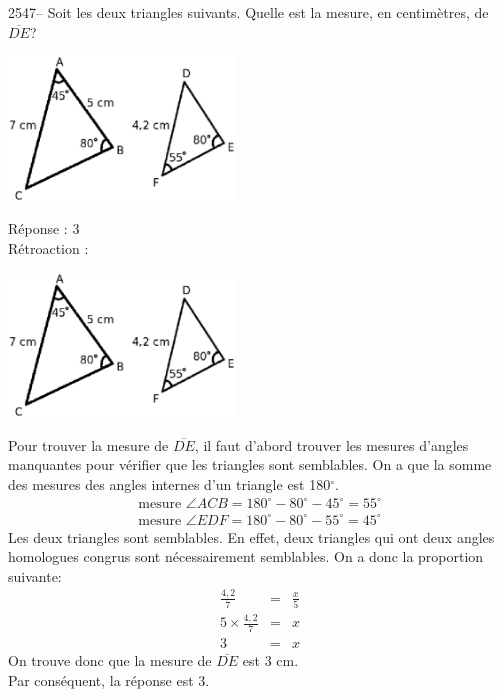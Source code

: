 \documentclass[letterpaper, 12pt]{article}
\begin{document}
2547-- Soit les deux triangles suivants. Quelle est la mesure, en centim\`etres, de $\overline{DE}$?\\
\begin{center}
 \includegraphics[width=6cm,bb=14 14 471 303]{Q2547.eps}
\end{center}

R\'eponse : 3\\

R\'etroaction :\\
\begin{center}
 \includegraphics[width=6cm,bb=14 14 471 303]{Q2547.eps}
\end{center}
Pour trouver la mesure de $\overline{DE}$, il faut d'abord trouver les mesures d'angles manquantes pour v\'erifier que les triangles sont semblables. On a que la somme des mesures des angles internes d'un triangle est 180$^{\circ}$.
\begin{eqnarray*}
 \textrm{mesure }\angle ACB = 180^{\circ}-80^{\circ}-45^{\circ}=55^{\circ}\\
 \textrm{mesure }\angle EDF = 180^{\circ}-80^{\circ}-55^{\circ}=45^{\circ}
\end{eqnarray*}
Les deux triangles sont semblables. En effet, deux triangles qui ont deux angles homologues congrus sont n\'ecessairement semblables. On a donc la proportion suivante:
\begin{eqnarray*}
 \frac{4,2}{7}&=&\frac{x}{5}\\[2mm]
 5 \times \frac{4,2}{7}&=&x\\[2mm]
3&=&x
\end{eqnarray*}
On trouve donc que la mesure de $\overline{DE}$ est 3 cm.\\
Par cons\'equent, la r\'eponse est 3.\\
\end{document}
